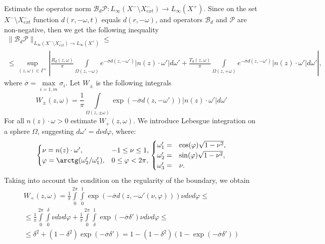 \documentclass[12pt,reqno]{report}
\begin{document}
Estimate the operator norm
$\mathcal B_d \mathcal P: L_{\infty}(X^-\setminus X^-_{ext})\to L_{\infty}(X^+)$.
Since on the set $X^- \setminus X^-_{ext}$ function $d(r,-\omega,t)$ equals $d(r,-\omega)$,  
and operators $\mathcal B_d$ and $\mathcal P$ are non-negative, then we get the following inequality \begin{multline}
\|\mathcal B_d \mathcal  P  \|_{L_{\infty}(X^-\setminus X^-_{ext})\to L_{\infty}(X^+)} \leq \\ \leq  \sup \limits_{(z,\omega)\in \Gamma^+} \left| \frac{R_d (z,\omega)}{\pi}  \int
\limits_{\Omega(z,-\omega)} e^{-\overline{\sigma} d(z,-\omega')} |n(z)\cdot \omega'| d \omega' +   \frac{T_d (z,\omega)}{\pi} \int
\limits_{\Omega(z,+\omega)} e^{-\overline{\sigma} d(z,-\omega')} |n(z)\cdot \omega'| d
\omega'  \right|,
\end{multline}
where $\overline{\sigma}=\max \limits_{i=\overline{1,m}} \sigma_i$.
Let $W_{\pm}$ is the following integrals
$$
W_{\pm}(z,\omega)=\frac{1}{\pi} \int \limits_{\Omega(z,\pm \omega)}\exp \left (- \overline{\sigma} d(z,-\omega')\right)  |n(z)\cdot \omega'| d\omega'
$$
For all $n(z) \cdot \omega>0$ estimate $W_+(z,\omega)$.
We introduce Lebesgue integration on a sphere $\Omega$, suggesting $d\omega'=d\nu d\varphi$, where:
\begin{equation}
\begin{cases}
\nu = n(z) \cdot \omega', & -1 \leq \nu \leq 1, \\
\varphi= \arctg(\omega'_2/\omega'_1), & 0 \leq \varphi < 2 \pi,
\end{cases}
\begin{cases}
\omega'_1=&\cos (\varphi) \sqrt{1-\nu^2}, \\
\omega'_2=&\sin (\varphi) \sqrt{1-\nu^2}, \\
\omega'_3=&\nu.
\end{cases}
\end{equation}
Taking into account the condition on the regularity of the boundary, we obtain
\begin{multline}
W_+(z,\omega)=\frac{1}{\pi} \int \limits_{0}^{2\pi} \int \limits_{0}^{1} \exp \left (- \overline{\sigma} d(z,-\omega'(\nu,\varphi))\right)  \nu d \nu d\varphi \leq \\  \leq \frac{1}{\pi} \int \limits_{0}^{2\pi} \int \limits_{0}^{\delta}   \nu d \nu d\varphi
+ \frac{1}{\pi} \int \limits_{0}^{2\pi} \int \limits_{\delta}^{1} \exp \left (- \overline{\sigma}\delta'\right)  \nu d \nu d\varphi
\leq \\ \leq
\delta^2 +  (1-\delta^2)\exp \left (- \overline{\sigma} \delta'\right) =1-(1-\delta^2)(1-\exp \left (- \overline{\sigma} \delta'\right))
\end{multline}
\end{document}
